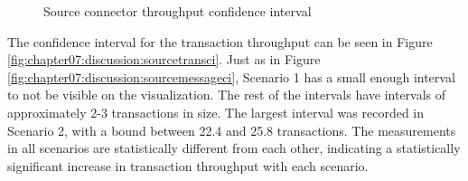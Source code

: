 \begin{figure}[htbp]
    \centering
    \hfill
    \hfill
    \caption{Source connector throughput confidence interval}
    \label{fig:chapter07:discussion:sourceci}
\end{figure}

The confidence interval for the transaction throughput can be seen in Figure \ref{fig:chapter07:discussion:sourcetransci}. Just as in Figure \ref{fig:chapter07:discussion:sourcemessageci}, Scenario 1 has a small enough interval to not be visible on the visualization. The rest of the intervals have intervals of approximately 2-3 transactions in size. The largest interval was recorded in Scenario 2, with a bound between 22.4 and 25.8 transactions. The measurements in all scenarios are statistically different from each other, indicating a statistically significant increase in transaction throughput with each scenario.

